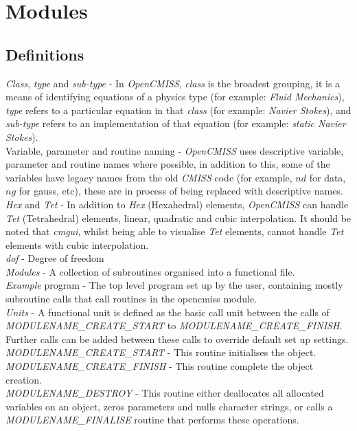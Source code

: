 \clearemptydoublepage
\chapter{Modules}
\label{cha:modules}

\section{Definitions}
\label{sec:definitions}

\emph{Class}, \emph{type} and \emph{sub-type} - In \emph{OpenCMISS}, \emph{class} 
is the broadest grouping, it is a means of identifying equations of a physics 
type (for example: \emph{Fluid Mechanics}), \emph{type} refers to a particular 
equation in that \emph{class} (for example: \emph{Navier Stokes}), and 
\emph{sub-type} refers to an implementation of that equation (for example: 
\emph{static Navier Stokes}). \\

\noindent Variable, parameter and routine naming - \emph{OpenCMISS} uses descriptive variable, 
parameter and routine names where possible, in addition to this, some of the variables have 
legacy names from the old \emph{CMISS} code (for example, $nd$ for data, $ng$ for gauss, 
etc), these are in process of being replaced with descriptive names. \\
\linebreak
\emph{Hex} and \emph{Tet} - In addition to \emph{Hex} (Hexahedral) elements, 
\emph{OpenCMISS} can handle \emph{Tet} (Tetrahedral) elements, linear, quadratic 
and cubic interpolation. It should be noted that \emph{cmgui}, whilst being 
able to visualise \emph{Tet} elements, cannot handle \emph{Tet} elements with 
cubic interpolation. \\
\linebreak
\emph{dof} - Degree of freedom \\
\linebreak
\emph{Modules} - A collection of subroutines organised into a functional file. \\
\linebreak
\emph{Example} program - The top level program set up by the user, containing mostly
subroutine calls that call routines in the opencmiss module. \\
\linebreak
\emph{Units} - A functional unit is defined as the basic
call unit between the calls of \emph{MODULENAME\_CREATE\_START} to 
\emph{MODULENAME\_CREATE\_FINISH}. Further calls can be added between these calls to 
override default set up settings. \\
\linebreak
\emph{MODULENAME\_CREATE\_START} - This routine initialises the object. \\
\linebreak
\emph{MODULENAME\_CREATE\_FINISH} - This routine complete the object creation. \\
\linebreak
\emph{MODULENAME\_DESTROY} - This routine either deallocates all allocated variables on an object,
zeros parameters and nulls character strings, or calls a \emph{MODULENAME\_FINALISE} routine 
that performs these operations.


